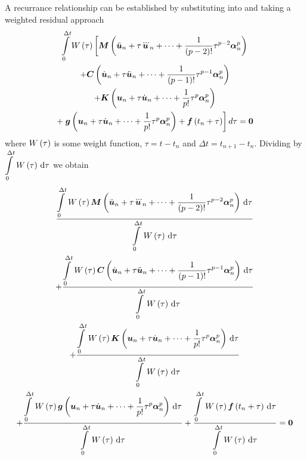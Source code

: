 A recurrance relationship can be established by substituting
 into  and
taking a weighted residual approach \ie
\begin{multline}
  \dintl{0}{\Delta
    t}\fnof{W}{\tau}\left[\matr{M}\pbrac{\ddot{\vectr{u}}_{n}+\tau\dddot{\vectr{u}}_{n}+\cdots+
    \dfrac{1}{\factorial{p-2}}\tau^{p-2}\vectr{\alpha}^{p}_{n}} \right.\\
  +\matr{C}\pbrac{\dot{\vectr{u}}_{n}+\tau\ddot{\vectr{u}}_{n}+\cdots+
    \dfrac{1}{\factorial{p-1}}\tau^{p-1}\vectr{\alpha}^{p}_{n}} \\
  +\matr{K}\pbrac{\vectr{u}_{n}+\tau\dot{\vectr{u}}_{n}+\cdots+
    \dfrac{1}{p!}\tau^{p}\vectr{\alpha}^{p}_{n}} \\
  +\left.\fnof{\vectr{g}}{\vectr{u}_{n}+\tau\dot{\vectr{u}}_{n}+\cdots+
    \dfrac{1}{p!}\tau^{p}\vectr{\alpha}^{p}_{n}}+\fnof{\vectr{f}}{t_{n}+\tau}\right] d\tau = \vectr{0}
\end{multline}
where $ W\left( \tau \right) $ is some weight function, $\tau=t-t_{n}$ and $\Delta
t=t_{n+1}-t_{n}$. Dividing by $\gint{0}{\Delta t}{\fnof{W}{\tau}}{\tau}$ we obtain
\begin{multline}
  \dfrac{\gint{0}{\Delta t}{\fnof{W}{\tau}\matr{M}\pbrac{\ddot{\vectr{u}}_{n}+\tau\dddot{\vectr{u}}_{n}+\cdots+
        \dfrac{1}{\factorial{p-2}}\tau^{p-2}\vectr{\alpha}^{p}_{n}}}{\tau}}{\gint{0}{\Delta
      t}{\fnof{W}{\tau}}{\tau}} \\
  + \dfrac{\gint{0}{\Delta t}{\fnof{W}{\tau}\matr{C}\pbrac{\dot{\vectr{u}}_{n}+\tau\ddot{\vectr{u}}_{n}+\cdots+
        \dfrac{1}{\factorial{p-1}}\tau^{p-1}\vectr{\alpha}^{p}_{n}}}{\tau}}{\gint{0}{\Delta
      t}{\fnof{W}{\tau}}{\tau}} \\
  + \dfrac{\gint{0}{\Delta t}{\fnof{W}{\tau}\matr{K}\pbrac{\vectr{u}_{n}+\tau\dot{\vectr{u}}_{n}+\cdots+
        \dfrac{1}{p!}\tau^{p}\vectr{\alpha}^{p}_{n}}}{\tau}}{\gint{0}{\Delta
      t}{\fnof{W}{\tau}}{\tau}} \\
  + \dfrac{\gint{0}{\Delta t}{\fnof{W}{\tau}\fnof{\vectr{g}}{\vectr{u}_{n}+\tau\dot{\vectr{u}}_{n}+\cdots+
        \dfrac{1}{p!}\tau^{p}\vectr{\alpha}^{p}_{n}}}{\tau}}{\gint{0}{\Delta
      t}{\fnof{W}{\tau}}{\tau}}  
  + \dfrac{\gint{0}{\Delta t}{\fnof{W}{\tau}\fnof{\vectr{f}}{t_{n}+
        \tau}}{\tau}}{\gint{0}{\Delta t}{\fnof{W}{\tau}}{\tau}}=\vectr{0}
\end{multline}

